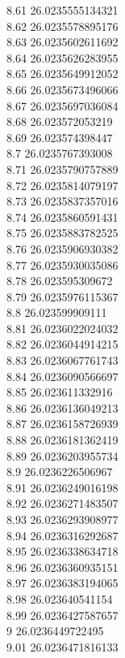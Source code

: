 {8.61	26.0235555134321\\
8.62	26.0235578895176\\
8.63	26.0235602611692\\
8.64	26.0235626283955\\
8.65	26.0235649912052\\
8.66	26.0235673496066\\
8.67	26.0235697036084\\
8.68	26.023572053219\\
8.69	26.023574398447\\
8.7	26.0235767393008\\
8.71	26.0235790757889\\
8.72	26.0235814079197\\
8.73	26.0235837357016\\
8.74	26.0235860591431\\
8.75	26.0235883782525\\
8.76	26.0235906930382\\
8.77	26.0235930035086\\
8.78	26.023595309672\\
8.79	26.0235976115367\\
8.8	26.023599909111\\
8.81	26.0236022024032\\
8.82	26.0236044914215\\
8.83	26.0236067761743\\
8.84	26.0236090566697\\
8.85	26.023611332916\\
8.86	26.0236136049213\\
8.87	26.0236158726939\\
8.88	26.0236181362419\\
8.89	26.0236203955734\\
8.9	26.0236226506967\\
8.91	26.0236249016198\\
8.92	26.0236271483507\\
8.93	26.0236293908977\\
8.94	26.0236316292687\\
8.95	26.0236338634718\\
8.96	26.0236360935151\\
8.97	26.0236383194065\\
8.98	26.023640541154\\
8.99	26.0236427587657\\
9	26.0236449722495\\
9.01	26.0236471816133\\
}
